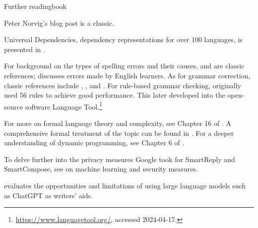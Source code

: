 \begin{tblsfilledsymbol}{Further reading}{book}


 Peter Norvig's blog post  \citep{Norvig:2007} is a classic. 
 
 Universal Dependencies, dependency representations for over 100 languages, is presented in \citet{Nivre-etal:2016}.

For background on the types of spelling errors and their causes, \citet{damerau:64,kukich:92} and \citet{mitton:96} are classic references; \citet{Flor-etal:2015} discusses errors made by English learners. As for grammar correction, classic references include \citet{Wilcox-etal:2008}, \citet{hirst:budanitsky:05}, and \citet{leacock-et-al:10}. For rule-based grammar checking, \citet{naber:03} originally used 56 rules to achieve good performance.  This later developed into the open-source software Language Tool.\footnote{\url{https://www.languagetool.org/}, accessed 2024-04-17.}

For more on formal language theory and complexity, see Chapter 16 of \citet{Jurafsky.Martin-09}.  A comprehensive formal treatment of the topic can be found in  \citet{Hopcroft.Motwani.Ullman-07}. For a deeper understanding of dynamic programming, see Chapter 6 of \citet{kleinberg-tardos}.

To delve further into the privacy measures Google took for SmartReply and SmartCompose, see  \citet{Carlini-etal:2019}  on machine learning and security measures.

\citet{Lingard:2023} evaluates the opportunities and limitations of using large language models such as ChatGPT as writers' aids.

\end{tblsfilledsymbol}



